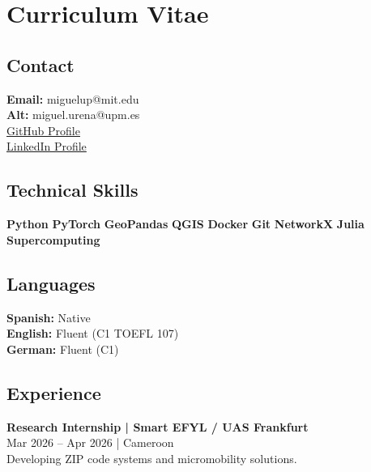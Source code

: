 \documentclass[11pt]{article}
\newcommand{\tagpill}[1]{%
    \colorbox{TagBg}{\textcolor{TagText}{\bfseries\scriptsize #1}}%
}
\begin{document}
\section*{Curriculum Vitae}

\begin{tcolorbox}[colback=CVBg, colframe=white, boxrule=0pt, arc=5pt]
    \begin{minipage}[t]{0.32\textwidth}
        \subsection*{Contact}
        {\small
        \textbf{Email:} miguelup@mit.edu \\
        \textbf{Alt:} miguel.urena@upm.es \\
        \href{https://github.com/MiguelUrenaPliego}{GitHub Profile} \\
        \href{https://www.linkedin.com/in/miguel-ureña-pliego}{LinkedIn Profile}
        }
        
        \subsection*{Technical Skills}
        \raggedright
        \tagpill{Python} \tagpill{PyTorch} \tagpill{GeoPandas} \tagpill{QGIS} \tagpill{Docker} \tagpill{Git} \tagpill{NetworkX} \tagpill{Julia} \tagpill{Supercomputing}
        
        \subsection*{Languages}
        {\small
        \textbf{Spanish:} Native \\
        \textbf{English:} Fluent (C1 TOEFL 107) \\
        \textbf{German:} Fluent (C1)
        }
    \end{minipage}
    \hfill
    \begin{minipage}[t]{0.64\textwidth}
        \subsection*{Experience}
        \textbf{Research Internship | Smart EFYL / UAS Frankfurt} \\
        {\footnotesize Mar 2026 – Apr 2026 | Cameroon} \\
        {\small Developing ZIP code systems and micromobility solutions.}
        

\end{minipage}
\end{tcolorbox}
\end{document}
